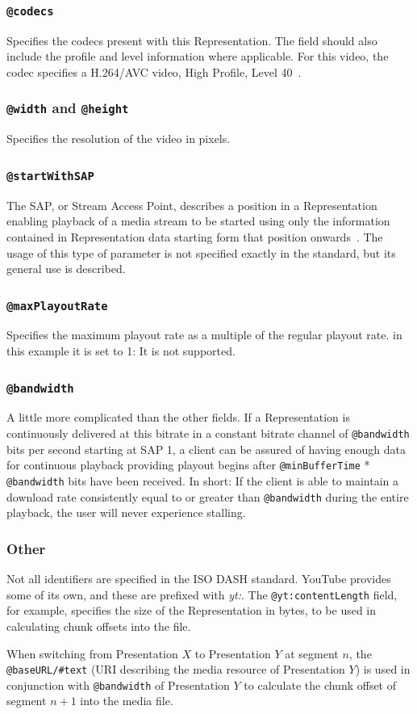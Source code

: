 \subsubsection{\texttt{@codecs}}
Specifies the codecs present with this
Representation. The field should also include the profile and level
information where applicable. For this video, the codec specifies a
H.264/AVC video, High Profile, Level 40~\cite[p. 12]{rfc6381}.

\subsubsection{\texttt{@width} and \texttt{@height}}
Specifies the resolution of the video in pixels.

\subsubsection{\texttt{@startWithSAP}}
The SAP, or Stream Access Point, describes a position in a Representation
enabling playback of a media stream to be started using only the information
contained in Representation data starting form that position
onwards~\cite[p. 11]{iso-dash-2014}. The usage of this type of parameter
is not specified exactly in the standard, but its general use is described.

\subsubsection{\texttt{@maxPlayoutRate}}
Specifies the maximum playout rate as a multiple of the
regular playout rate. in this example it is set to 1: It is not supported.

\subsubsection{\texttt{@bandwidth}}
A little more complicated than the other fields.
If a Representation is continuously delivered at this bitrate in a
constant bitrate channel of \texttt{@bandwidth} bits per second starting at
SAP 1, a client
can be assured of having enough data for continuous playback providing
playout begins after \texttt{@minBufferTime} * \texttt{@bandwidth} bits have been
received. In short: If the client is able to maintain a download rate
consistently equal to or greater than \texttt{@bandwidth} during the entire
playback, the user will never experience stalling.

\subsubsection{Other}
Not all identifiers are specified in the ISO DASH standard. YouTube
provides some of its own, and these are prefixed with \textit{yt:}.
The \texttt{@yt:contentLength} field, for example, specifies the size of the
Representation in bytes, to be used in calculating chunk offsets into the file.

When switching from Presentation $X$ to Presentation $Y$ at segment $n$, the
\texttt{@baseURL/\#text} (URI describing the media resource of Presentation $Y$)
is used in conjunction with \texttt{@bandwidth} of Presentation $Y$ to
calculate the chunk offset of segment $n+1$ into the media file.


